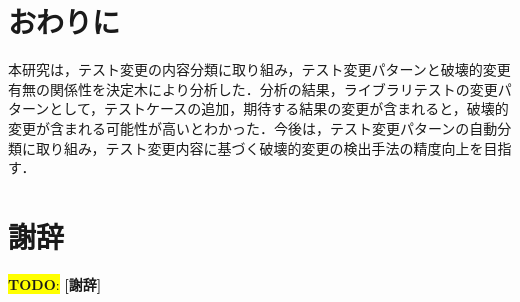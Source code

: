 \documentclass[uplatex,dvipdfmx,a4paper,twocolumn,base=11pt,jbase=11pt,ja=standard]{bxjsarticle}  %
\newcommand{\todo}[1]{\colorbox{yellow}{{\bf TODO}:}{\color{red} {\textbf{[#1]}}}}
\begin{document}

\section{おわりに}

本研究は，テスト変更の内容分類に取り組み，テスト変更パターンと破壊的変更有無の関係性を決定木により分析した．分析の結果，ライブラリテストの変更パターンとして，テストケースの追加，期待する結果の変更が含まれると，破壊的変更が含まれる可能性が高いとわかった．今後は，テスト変更パターンの自動分類に取り組み，テスト変更内容に基づく破壊的変更の検出手法の精度向上を目指す．

\section*{謝辞}

\todo{謝辞}

 

\end{document}
